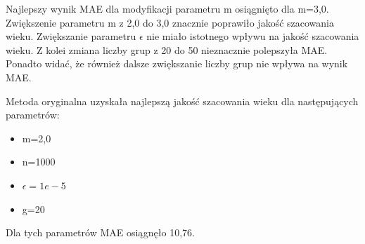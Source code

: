 \documentclass[a4paper,twoside,12pt]{book}
\begin{document}
    Najlepszy wynik MAE dla modyfikacji parametru m osiągnięto dla m=3,0. Zwiększenie parametru m z 2,0 do 3,0
    znacznie poprawiło jakość szacowania wieku.
    Zwiększanie parametru $\epsilon$ nie miało istotnego wpływu na jakość szacowania wieku.
    Z kolei zmiana liczby grup z 20 do 50 nieznacznie polepszyła MAE. Ponadto widać, że również dalsze zwiększanie
    liczby grup
    nie
    wpływa na wynik MAE.

    Metoda oryginalna uzyskała najlepszą jakość szacowania wieku dla następujących parametrów:
    \begin{itemize}
        \item m=2,0
        \item n=1000
        \item $\epsilon=1e-5$
        \item g=20
    \end{itemize}
    Dla tych parametrów MAE osiągnęło 10,76.
\end{document}
